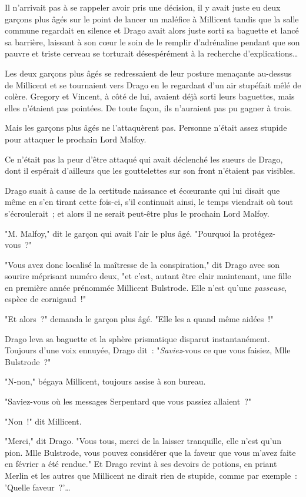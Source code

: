 Il n'arrivait pas à se rappeler avoir pris une décision, il y avait juste eu deux garçons plus âgés sur le point de lancer un maléfice à Millicent tandis que la salle commune regardait en silence et Drago avait alors juste sorti sa baguette et lancé sa barrière, laissant à son cœur le soin de le remplir d'adrénaline pendant que son pauvre et triste cerveau se torturait désespérément à la recherche d'explications…

Les deux garçons plus âgés se redressaient de leur posture menaçante au-dessus de Millicent et se tournaient vers Drago en le regardant d'un air stupéfait mêlé de colère. Gregory et Vincent, à côté de lui, avaient déjà sorti leurs baguettes, mais elles n'étaient pas pointées. De toute façon, ils n'auraient pas pu gagner à trois.

Mais les garçons plus âgés ne l'attaquèrent pas. Personne n'était assez stupide pour attaquer le prochain Lord Malfoy.

Ce n'était pas la peur d'être attaqué qui avait déclenché les sueurs de Drago, dont il espérait d'ailleurs que les gouttelettes sur son front n'étaient pas visibles.

Drago suait à cause de la certitude naissance et écœurante qui lui disait que même en s'en tirant cette fois-ci, s'il continuait ainsi, le temps viendrait où tout s'écroulerait~; et alors il ne serait peut-être plus le prochain Lord Malfoy.

"M. Malfoy," dit le garçon qui avait l'air le plus âgé. "Pourquoi la protégez-vous~?"

"Vous avez donc localisé la maîtresse de la conspiration," dit Drago avec son sourire méprisant numéro deux, "et c'est, autant être clair maintenant, une fille en première année prénommée Millicent Bulstrode. Elle n'est qu'une \emph{passeuse}, espèce de cornigaud~!"

"Et alors~?" demanda le garçon plus âgé. "Elle les a quand même aidées~!"

Drago leva sa baguette et la sphère prismatique disparut instantanément. Toujours d'une voix ennuyée, Drago dit~: "\emph{Saviez}-vous ce que vous faisiez, Mlle Bulstrode~?"

"N-non," bégaya Millicent, toujours assise à son bureau.

"Saviez-vous où les messages Serpentard que vous passiez allaient~?"

"Non~!" dit Millicent.

"Merci," dit Drago. "Vous tous, merci de la laisser tranquille, elle n'est qu'un pion. Mlle Bulstrode, vous pouvez considérer que la faveur que vous m'avez faite en février a été rendue." Et Drago revint à ses devoirs de potions, en priant Merlin et les autres que Millicent ne dirait rien de stupide, comme par exemple~: 'Quelle faveur~?'…

